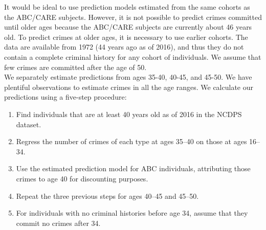 \noindent It would be ideal to use prediction models estimated from the same cohorts as the ABC/CARE subjects. However, it is not possible to predict crimes committed until older ages because the ABC/CARE subjects are currently about 46 years old. To predict crimes at older ages, it is necessary to use earlier cohorts. The data are available from 1972 (44 years ago as of 2016), and thus they do not contain a complete criminal history for any cohort of individuals. 
We assume that few crimes are committed after the age of 50. \\
 We separately estimate predictions from ages 35-40, 40-45, and 45-50. We have plentiful observations to estimate crimes in all the age ranges. %
We calculate our predictions using a five-step procedure: \\
\begin{enumerate}
\item Find individuals that are at least 40 years old as of 2016 in the NCDPS dataset.
\item Regress the number of crimes of each type at ages 35--40 on those at ages 16--34.
\item Use the estimated prediction model for ABC individuals, attributing those crimes to age 40 for discounting purposes.
\item Repeat the three previous steps for ages 40--45 and 45--50. %
\item For individuals with no criminal histories before age 34, assume that they commit no crimes after 34.
\end{enumerate}

